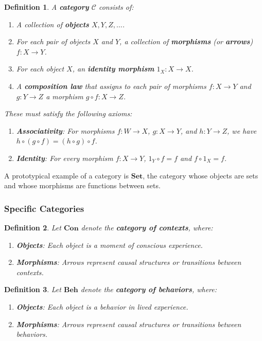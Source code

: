 \documentclass{article}
\newtheorem{definition}{Definition}[section]
\begin{document}
\begin{definition}
A \textbf{category} $\mathcal{C}$ consists of:
\begin{enumerate}[label=(\alph*)]
    \item A collection of \textbf{objects} $X, Y, Z, \dots$.
    \item For each pair of objects $X$ and $Y$, a collection of \textbf{morphisms} (or \textbf{arrows}) $f \colon X \to Y$.
    \item For each object $X$, an \textbf{identity morphism} $1_X \colon X \to X$.
    \item A \textbf{composition law} that assigns to each pair of morphisms $f \colon X \to Y$ and $g \colon Y \to Z$ a morphism $g \circ f \colon X \to Z$.
\end{enumerate}
These must satisfy the following axioms:
\begin{enumerate}
    \item \textbf{Associativity}: For morphisms $f \colon W \to X$, $g \colon X \to Y$, and $h \colon Y \to Z$, we have $h \circ (g \circ f) = (h \circ g) \circ f$.
    \item \textbf{Identity}: For every morphism $f \colon X \to Y$, $1_Y \circ f = f$ and $f \circ 1_X = f$.
\end{enumerate}
\end{definition}

A prototypical example of a category is $\mathbf{Set}$, the category whose objects are sets and whose morphisms are functions between sets.

\subsubsection{Specific Categories}

\begin{definition}
Let $\mathbf{Con}$ denote the \textbf{category of contexts}, where:
\begin{enumerate}
    \item \textbf{Objects}: Each object is a moment of conscious experience.
    \item \textbf{Morphisms}: Arrows represent causal structures or transitions between contexts.
\end{enumerate}
\end{definition}

\begin{definition}
Let $\mathbf{Beh}$ denote the \textbf{category of behaviors}, where:
\begin{enumerate}
    \item \textbf{Objects}: Each object is a behavior in lived experience.
    \item \textbf{Morphisms}: Arrows represent causal structures or transitions between behaviors.
\end{enumerate}
\end{definition}
\end{document}
